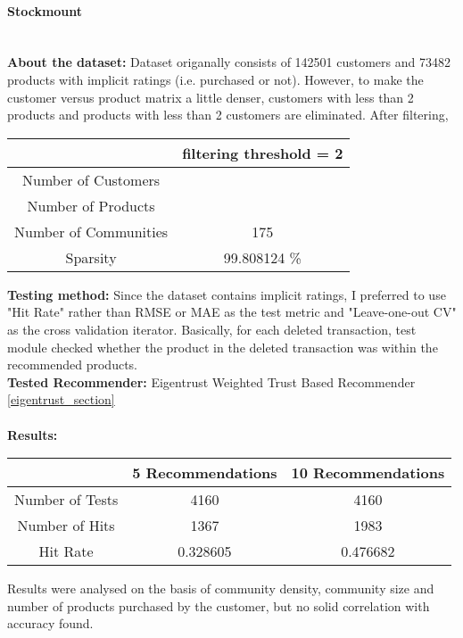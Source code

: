 	\paragraph{Stockmount} \mbox{}\\
	\textbf{About the dataset:} Dataset origanally consists of 142501 customers and 73482 products with implicit ratings (i.e. purchased or not). However, to make the customer versus product matrix a little denser, customers with less than 2 products and products with less than 2 customers are eliminated. After filtering,
	\begin{center}
		\begin{tabular}{ | c | c |}
			\hline
			& filtering threshold = 2\\ 
			\hline
			Number of Customers & \\  
			\hline
			Number of Products & \\  
			\hline
			Number of Communities & 175\\  
			\hline
			Sparsity & 99.808124 \% \\   
			\hline
		\end{tabular}
	\end{center} 
	\vspace{0.5cm}
	\textbf{Testing method:} Since the dataset contains implicit ratings, I preferred to use "Hit Rate" rather than RMSE or MAE as the test metric and "Leave-one-out CV" as the cross validation iterator. Basically, for each deleted transaction, test module checked whether the product in the deleted transaction was within the recommended products.\\
	\textbf{Tested Recommender:} Eigentrust Weighted Trust Based Recommender \ref{eigentrust_section} \\ \\
	\textbf{Results:}
	\begin{center}
		\begin{tabular}{ | c | c | c |}
			\hline
			& 5 Recommendations & 10 Recommendations\\ 
			\hline
			Number of Tests&  4160 & 4160\\  
			\hline
			Number of Hits&  1367 & 1983\\  
			\hline
			Hit Rate &   0.328605 & 0.476682\\  
			\hline
		\end{tabular}
	\end{center} 
	Results were analysed on the basis of community density, community size and number of products purchased by the customer, but no solid correlation with accuracy found.
	
